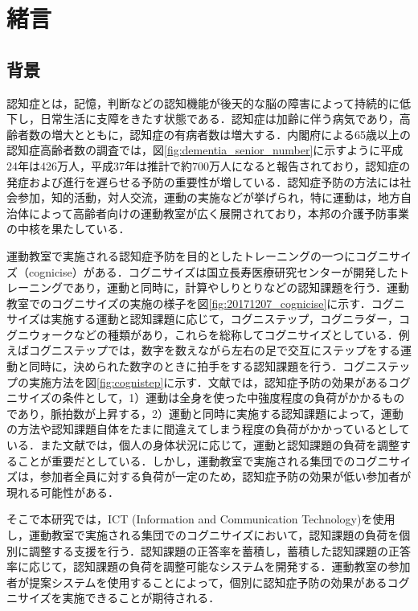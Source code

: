 \chapter{緒言}
\thispagestyle{myheadings}

\section{背景}
認知症とは，記憶，判断などの認知機能が後天的な脳の障害によって持続的に低下し，日常生活に支障をきたす状態である\cite{認知症とは}．認知症は加齢に伴う病気であり，高齢者数の増大とともに，認知症の有病者数は増大する\cite{認知症予防マニュアル}．内閣府による65歳以上の認知症高齢者数の調査\cite{高齢社会白書}では，図\ref{fig:dementia_senior_number}に示すように平成24年は426万人，平成37年は推計で約700万人になると報告されており，認知症の発症および進行を遅らせる予防の重要性が増している\cite{新オレンジプラン}．認知症予防の方法には社会参加，知的活動，対人交流，運動の実施などが挙げられ\cite{運動の効果}，特に運動は，地方自治体によって高齢者向けの運動教室が広く展開されており，本邦の介護予防事業の中核を果たしている\cite{新オレンジプラン}\cite{運動教室}．

運動教室で実施される認知症予防を目的としたトレーニングの一つにコグニサイズ（cognicise）がある\cite{コグニサイズとは}．コグニサイズは国立長寿医療研究センター\cite{国立長寿医療研究センター}が開発したトレーニングであり，運動と同時に，計算やしりとりなどの認知課題を行う．運動教室でのコグニサイズの実施の様子を図\ref{fig:20171207_cognicise}に示す．コグニサイズは実施する運動と認知課題に応じて，コグニステップ，コグニラダー，コグニウォークなどの種類があり，これらを総称してコグニサイズとしている\cite{認知症予防へ向けた運動コグニサイズ}．例えばコグニステップでは，数字を数えながら左右の足で交互にステップをする運動と同時に，決められた数字のときに拍手をする認知課題を行う．コグニステップの実施方法を図\ref{fig:cognistep}に示す．文献\cite{コグニサイズとは}では，認知症予防の効果があるコグニサイズの条件として，1）運動は全身を使った中強度程度の負荷がかかるものであり，脈拍数が上昇する，2）運動と同時に実施する認知課題によって，運動の方法や認知課題自体をたまに間違えてしまう程度の負荷がかかっているとしている．また文献\cite{認知症予防へ向けた運動コグニサイズ}では，個人の身体状況に応じて，運動と認知課題の負荷を調整することが重要だとしている．しかし，運動教室で実施される集団でのコグニサイズは，参加者全員に対する負荷が一定のため，認知症予防の効果が低い参加者が現れる可能性がある\cite{運動教室の効果}．

そこで本研究では，ICT (Information and Communication Technology)を使用し，運動教室で実施される集団でのコグニサイズにおいて，認知課題の負荷を個別に調整する支援を行う．認知課題の正答率を蓄積し，蓄積した認知課題の正答率に応じて，認知課題の負荷を調整可能なシステムを開発する．運動教室の参加者が提案システムを使用することによって，個別に認知症予防の効果があるコグニサイズを実施できることが期待される．

